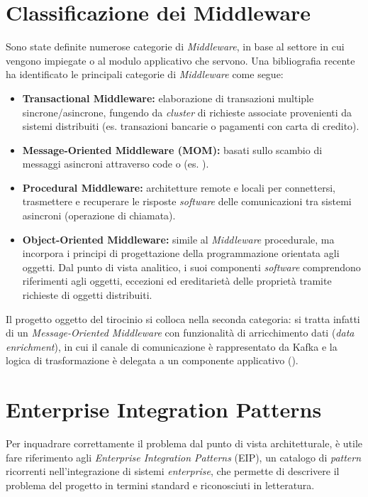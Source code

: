 \section{Classificazione dei Middleware}
Sono state definite numerose categorie di \textit{Middleware}, in base al settore in cui vengono impiegate o al modulo applicativo che servono. 
Una bibliografia recente ha identificato le principali categorie di \textit{Middleware} come segue: 
\begin{itemize}
    \item \textbf{Transactional Middleware:} elaborazione di transazioni multiple sincrone/asincrone, fungendo da \textit{cluster} di richieste associate provenienti da sistemi distribuiti (es. transazioni bancarie o pagamenti con carta di credito).
    \item \textbf{Message-Oriented Middleware (\acrshort{MOM}):} basati sullo scambio di messaggi asincroni attraverso code o \textit{} (es. ).
    \item \textbf{Procedural Middleware:} architetture remote e locali per connettersi, trasmettere e recuperare le risposte \textit{software} delle comunicazioni tra sistemi asincroni (operazione di chiamata).
    \item \textbf{Object-Oriented Middleware:} simile al \textit{Middleware} procedurale, ma incorpora i principi di progettazione della programmazione orientata agli oggetti. Dal punto di vista analitico, i suoi componenti \textit{software} comprendono riferimenti agli oggetti, eccezioni ed ereditarietà delle proprietà tramite richieste di oggetti distribuiti.
\end{itemize}
Il progetto oggetto del tirocinio si colloca nella seconda categoria: si tratta infatti di un \textit{Message-Oriented Middleware} con funzionalità di arricchimento dati (\textit{data enrichment}), in cui il canale di comunicazione è rappresentato da Kafka e la logica di trasformazione è delegata a un componente applicativo ().

\section{Enterprise Integration Patterns}
\label{Enterprise Integration Patterns}
Per inquadrare correttamente il problema dal punto di vista architetturale, è utile fare riferimento agli \textit{Enterprise Integration Patterns} (\acrshort{EIP}), un catalogo di \textit{pattern} ricorrenti nell'integrazione di sistemi \textit{enterprise}, che permette di descrivere il problema del progetto in termini standard e riconosciuti in letteratura.

